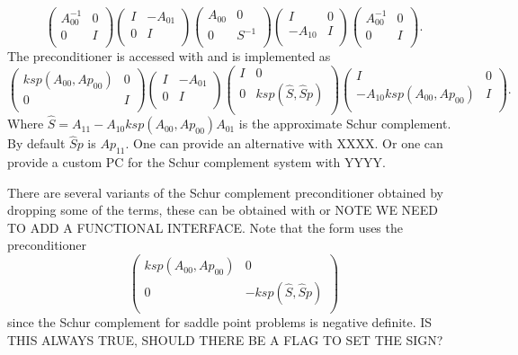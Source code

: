 \[
\left( \begin{array}{cc}
A_{00}^{-1}   & 0 \\
0 & I \\
\end{array} \right)
\left( \begin{array}{cc}
I   & -A_{01} \\
0 & I \\
\end{array} \right)
\left( \begin{array}{cc}
A_{00}  & 0 \\
0 & S^{-1} \\
\end{array} \right)
\left( \begin{array}{cc}
I   & 0 \\
-A_{10} & I \\
\end{array} \right)
\left( \begin{array}{cc}
A_{00}^{-1}   & 0 \\
0 & I \\
\end{array} \right).
\]
The preconditioner is accessed with  and is implemented as
\[
\left( \begin{array}{cc}
ksp(A_{00},Ap_{00})   & 0 \\
0 & I \\
\end{array} \right)
\left( \begin{array}{cc}
I   & -A_{01} \\
0 & I \\
\end{array} \right)
\left( \begin{array}{cc}
I  & 0 \\
0 & ksp(\hat{S},\hat{S}p) \\
\end{array} \right)
\left( \begin{array}{cc}
I   & 0 \\
-A_{10} ksp(A_{00},Ap_{00}) & I \\
\end{array} \right).
\]
Where $\hat{S} = A_{11} - A_{10} ksp(A_{00},Ap_{00}) A_{01}$ is the approximate Schur complement. By default $\hat{S}p$ is $Ap_{11}.$ One can provide an alternative with XXXX. Or one can provide a custom PC for the Schur complement system with YYYY.

There are several variants of the Schur complement preconditioner obtained by dropping some of the terms, these can be obtained with  or NOTE WE NEED TO ADD A FUNCTIONAL INTERFACE. Note that the  form uses the preconditioner
\[
\left( \begin{array}{cc}
ksp(A_{00},Ap_{00})   & 0 \\
0 & -ksp(\hat{S},\hat{S}p) \\
\end{array} \right)
\]
since the Schur complement for saddle point problems is negative definite. IS THIS ALWAYS TRUE, SHOULD THERE BE A FLAG TO SET THE SIGN?

